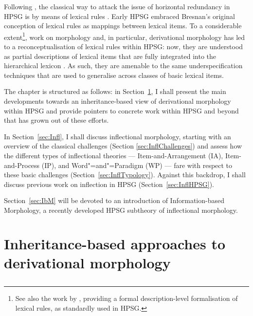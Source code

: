 \documentclass[output=paper
	        ,collection
	        ,collectionchapter
 	        ,biblatex
                ,babelshorthands
                ,newtxmath
                ,draftmode
                ,colorlinks, citecolor=brown
]{langscibook}
\begin{document}
Following \citet{Bresnan82}, the classical way to attack the issue of
horizontal redundancy in HPSG is by means of lexical rules
\citep{Flickinger87}. Early HPSG embraced Bresnan's original
conception of lexical rules as mappings between lexical items. To a
considerable extent\footnote{See also the work by
  \citet{meurers:towards,Meurers02}, providing a formal
  description-level formalisation of lexical rules, as standardly used
  in HPSG.}, work on morphology and, in particular, derivational
morphology has led to a reconceptualisation of lexical rules within
HPSG: now, they are understood as partial descriptions of lexical
items that are fully integrated into the hierarchical lexicon
\citep{meurers:towards,Copestake:01,Koenig99}. As such, they are
amenable to the same underspecification techniques that are used to
generalise across classes of basic lexical items.


The chapter is structured as follows: in Section~\ref{sec:Deriv}, I
shall present the main developments towards an inheritance-based view
of derivational morphology within HPSG and provide pointers to
concrete work within HPSG and beyond that has grown out of
these efforts. 

In Section~\ref{sec:Infl}, I shall discuss inflectional morphology,
starting with an overview of the classical challenges (Section
\ref{sec:InflChallenges}) and assess how the different types of
inflectional theories --- Item-and-Arrangement (IA), Item-and-Process
(IP), and Word"=and"=Paradigm (WP) --- fare with respect to these
basic challenges (Section~\ref{sec:InflTypology}). Against this
backdrop, I shall discuss previous work on inflection in HPSG
(Section~\ref{sec:InflHPSG}).

Section~\ref{sec:IbM} will be devoted to an introduction of
Information-based Morphology, a recently developed HPSG subtheory of
inflectional morphology.



\section{Inheritance-based approaches to derivational morphology}
\label{sec:Deriv}\label{sec:derivational-morphology}

\subsection{\citet{Krieger:Nerbonne:93}}
\end{document}
